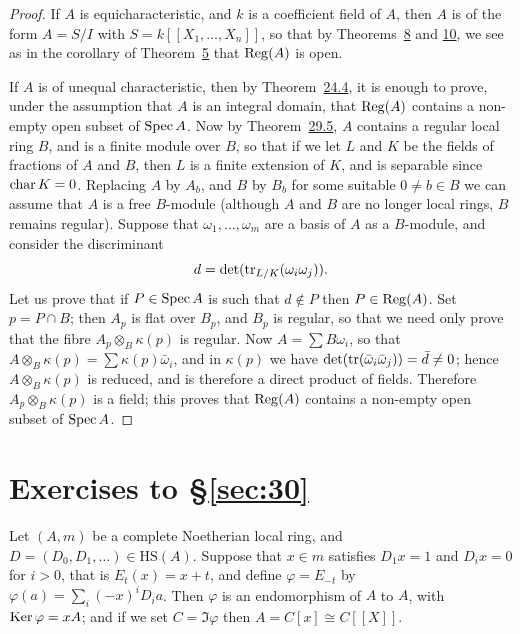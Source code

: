 \begin{proof}
If $A$ is equicharacteristic, and $k$ is a coefficient field of $A$, then $A$ is of the
form $A = S/I$ with $S = k[[X_1, \ldots, X_n]]$, so that by Theorems~\hyperref[thm:30.8]{8} and
\hyperref[thm:30.10]{10}, we see as in the corollary of Theorem~\hyperref[thm:30.5]{5} that $\operatorname{Reg}(A)$ is open.

If $A$ is of unequal characteristic, then by Theorem~\hyperref[thm:24.4]{24.4}, it is enough to
prove, under the assumption that $A$ is an integral domain, that $\operatorname{Reg}(A)$
contains a non-empty open subset of $\operatorname{Spec} A$. Now by
Theorem~\hyperref[thm:29.5]{29.5}, $A$ contains a regular local ring $B$, and is a finite module
over $B$, so that if we let $L$ and $K$ be the fields of fractions of $A$ and $B$,
then $L$ is a finite extension of $K$, and is separable since $\operatorname{char} K = 0$. Replacing
$A$ by $A_b$, and $B$ by $B_b$ for some suitable $0 \ne b \in B$ we can assume that $A$ is
a free $B$-module (although $A$ and $B$ are no longer local rings, $B$ remains
regular). Suppose that $\omega_1, \ldots, \omega_m$ are a basis of $A$ as a $B$-module, and
consider the discriminant
\[
  d = \det(\operatorname{tr}_{L/K}(\omega_i\omega_j)).
\]
Let us prove that if $P \in \operatorname{Spec} A$ is such that $d \notin P$ then $P \in \operatorname{Reg}(A)$. Set
$p = P \cap B$; then $A_p$ is flat over $B_p$, and $B_p$ is regular, so that we need only
prove that the fibre $A_p \otimes_B \kappa(p)$ is regular. Now $A = \sum B\omega_i$, so
that $A \otimes_B \kappa(p) = \sum \kappa(p)\bar{\omega}_i$, and in $\kappa(p)$ we have
$\det(\operatorname{tr}(\bar{\omega}_i\bar{\omega}_j)) = \bar{d} \ne 0$; hence $A \otimes_B \kappa(p)$ is reduced,
and is therefore a direct product of fields. Therefore $A_p \otimes_B \kappa(p)$ is a
field; this proves that $\operatorname{Reg}(A)$ contains a non-empty open subset of $\operatorname{Spec} A$.
\end{proof}

\section*{Exercises to \S\ref{sec:30}}

\begin{exercise}\label{ex:30.1-ex}
Let $(A, m)$ be a complete Noetherian local ring, and $D = (D_0, D_1, \ldots) \in
\mathrm{HS}(A)$. Suppose that $x \in m$ satisfies $D_1x = 1$ and $D_ix = 0$ for $i > 0$,
that is $E_t(x) = x + t$, and define $\varphi = E_{-t}$ by
$\varphi(a) = \sum_i (-x)^iD_ia$. Then $\varphi$ is an endomorphism of $A$ to $A$, with
$\operatorname{Ker} \varphi = xA$; and if we set $C = \Im \varphi$ then $A = C[x] \cong C[[X]]$.
\end{exercise}

